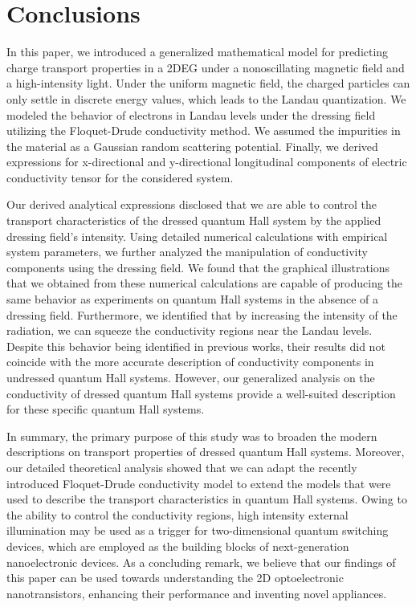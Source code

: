 \documentclass[
 reprint,
 amsmath,amssymb,
 aps,
 prb,
]{revtex4-2}
\begin{document}
\section{\label{sec_conclusions} Conclusions}

In this paper, we introduced a generalized mathematical model for predicting  charge transport properties in a 2DEG under a nonoscillating magnetic field and a high-intensity light. Under the uniform magnetic field, the charged particles can only settle in discrete energy values, which leads to the Landau quantization. We modeled the behavior of electrons in Landau levels under the dressing field utilizing the Floquet-Drude conductivity method. We assumed the impurities in the material as a Gaussian random scattering potential. Finally, we derived expressions for x-directional and y-directional longitudinal components of electric conductivity tensor for the considered system.

Our derived analytical expressions disclosed that we are able to control the transport characteristics of the dressed quantum Hall system by the applied dressing field’s intensity. Using detailed numerical calculations with empirical system parameters, we further analyzed the manipulation of conductivity components using the dressing field.
We found that the graphical illustrations that we obtained from these numerical calculations are capable of producing the same behavior as experiments on quantum Hall systems in the absence of a dressing field.
Furthermore, we identified that by increasing the intensity of the radiation, we can squeeze the conductivity regions near the Landau levels. Despite this behavior being identified in previous works, their results did not coincide with the more accurate description of conductivity components in undressed quantum Hall systems. However, our generalized analysis on the conductivity of dressed quantum Hall systems provide a well-suited description for these specific quantum Hall systems.

In summary, the primary purpose of this study was to broaden the modern descriptions on transport properties of dressed quantum Hall systems. Moreover, our detailed theoretical analysis showed that we can adapt the recently introduced Floquet-Drude conductivity model to extend the models that were used to describe the transport characteristics in quantum Hall systems. Owing to the ability to control the conductivity regions, high intensity external illumination may be used as a trigger for two-dimensional quantum switching devices, which are employed as the building blocks of next-generation nanoelectronic devices. As a concluding remark, we believe that our findings of this paper can be used towards understanding the 2D optoelectronic nanotransistors, enhancing their performance and inventing novel appliances.
\end{document}
